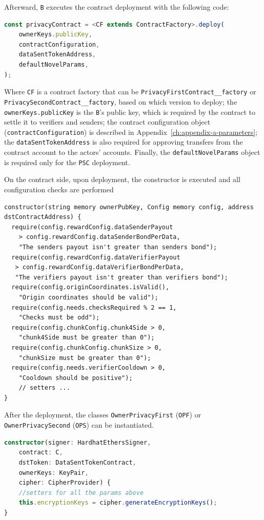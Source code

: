 Afterward, \texttt{B} executes the contract deployment with the following code:

\begin{lstlisting}[language=typescript,
    caption={\texttt{PrivacyContract} deployment}]
const privacyContract = <CF extends ContractFactory>.deploy(
    ownerKeys.publicKey,
    contractConfiguration,
    dataSentTokenAddress,
    defaultNovelParams,
);
\end{lstlisting}
Where \lstinline{CF} is a contract factory that can be \texttt{PrivacyFirstContract\_\_factory} or \texttt{PrivacySecondContract\_\_factory}, based on which version to deploy;
the \lstinline{ownerKeys.publicKey} is the \texttt{B}'s public key, which is required by the contract to settle it to verifiers and senders;
the contract configuration object (\lstinline{contractConfiguration}) is described in Appendix~\ref{ch:appendix-a-parameters}; the \lstinline{dataSentTokenAddress} is also required for approving transfers from the contract account to the actors' accounts.
Finally, the \lstinline{defaultNovelParams} object is required only for the \texttt{PSC} deployment.

On the contract side, upon deployment, the constructor is executed and all configuration checks are performed
\begin{lstlisting}[language=solidity,
    caption={\texttt{PrivacyFirstContract} constructor}, label={lst:privacy-first-contract-constructor}]
constructor(string memory ownerPubKey, Config memory config, address dstContractAddress) {
  require(config.rewardConfig.dataSenderPayout
    > config.rewardConfig.dataSenderBondPerData,
    "The senders payout isn't greater than senders bond");
  require(config.rewardConfig.dataVerifierPayout
   > config.rewardConfig.dataVerifierBondPerData,
   "The verifiers payout isn't greater than verifiers bond");
  require(config.originCoordinates.isValid(),
    "Origin coordinates should be valid");
  require(config.needs.checksRequired % 2 == 1,
    "Checks must be odd");
  require(config.chunkConfig.chunk4Side > 0,
    "chunk4Side must be greater than 0");
  require(config.chunkConfig.chunkSize > 0,
    "chunkSize must be greater than 0");
  require(config.needs.verifierCooldown > 0,
    "Cooldown should be positive");
    // setters ...
}
\end{lstlisting}

After the deployment, the classes \texttt{OwnerPrivacyFirst} (\texttt{OPF}) or \texttt{OwnerPrivacySecond} (\texttt{OPS}) can be instantiated.
\begin{lstlisting}[language=typescript, caption={\texttt{OPF}'s constructor, inherited by \texttt{OPS}},label={lst:proto-implementation-opf-constructor}]
    constructor(signer: HardhatEthersSigner,
    contract: C,
    dstToken: DataSentTokenContract,
    ownerKeys: KeyPair,
    cipher: CipherProvider) {
    //setters for all the params above
    this.encryptionKeys = cipher.generateEncryptionKeys();
}
\end{lstlisting}

